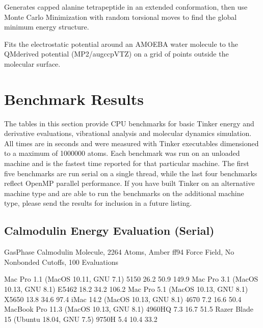 \documentclass[letterpaper,11pt,english]{sphinxmanual}
\begin{document}

Generates capped alanine tetrapeptide in an extended conformation, then use Monte Carlo Minimization with random torsional moves to find the global minimum energy structure.


Fits the electrostatic potential around an AMOEBA water molecule to the QM\sphinxhyphen{}derived potential (MP2/aug\sphinxhyphen{}cc\sphinxhyphen{}pVTZ) on a grid of points outside the molecular surface.


\chapter{Benchmark Results}
\label{\detokenize{text/benchmarks:benchmark-results}}\label{\detokenize{text/benchmarks::doc}}
The tables in this section provide CPU benchmarks for basic Tinker energy and derivative evaluations, vibrational analysis and molecular dynamics simulation. All times are in seconds and were measured with Tinker executables dimensioned to a maximum of 1000000 atoms. Each benchmark was run on an unloaded machine and is the fastest time reported for that particular machine. The first five benchmarks are run serial on a single thread, while the last four benchmarks reflect OpenMP parallel performance. If you have built Tinker on an alternative machine type and are able to run the benchmarks on the additional machine type, please send the results for inclusion in a future listing.


\section{Calmodulin Energy Evaluation (Serial)}
\label{\detokenize{text/benchmarks:calmodulin-energy-evaluation-serial}}
Gas\sphinxhyphen{}Phase Calmodulin Molecule, 2264 Atoms, Amber ff94 Force Field, No Nonbonded Cutoffs, 100 Evaluations


\begin{sphinxVerbatim}[commandchars=\\\{\}]
Mac Pro 1.1 (MacOS 10.11, GNU 7.1)             5150        26.2         50.9       149.9
Mac Pro 3.1 (MacOS 10.13, GNU 8.1)            E5462        18.2         34.2       106.2
Mac Pro 5.1 (MacOS 10.13, GNU 8.1)            X5650        13.8         34.6        97.4
iMac 14.2 (MacOS 10.13, GNU 8.1)               4670         7.2         16.6        50.4
MacBook Pro 11.3 (MacOS 10.13, GNU 8.1)      4960HQ         7.3         16.7        51.5
Razer Blade 15 (Ubuntu 18.04, GNU 7.5)        9750H         5.4         10.4        33.2
\end{sphinxVerbatim}
\end{document}
